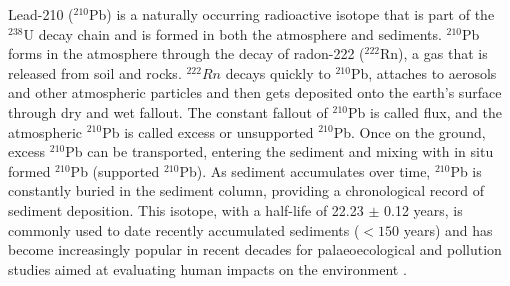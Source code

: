\documentclass [10pt] {article}
\begin{document}
	Lead-210 ($^{210}$Pb) is a naturally occurring radioactive isotope that is part of the $^{238}$U decay chain and is formed in both the atmosphere and sediments. $^{210}$Pb forms in the atmosphere through the decay of radon-222 ($^{222}$Rn), a gas that is released from soil and rocks. $^{222}Rn$ decays quickly to $^{210}$Pb, attaches to aerosols and other atmospheric particles and then gets deposited onto the earth's surface through dry and wet fallout. The constant fallout of $^{210}$Pb is called flux, and the atmospheric $^{210}$Pb is called excess or unsupported $^{210}$Pb. Once on the ground, excess $^{210}$Pb can be transported, entering the sediment and mixing with in situ formed $^{210}$Pb (supported $^{210}$Pb). As sediment accumulates over time, $^{210}$Pb is constantly buried in the sediment column, providing a chronological record of sediment deposition. This isotope, with a half-life of 22.23 $\pm$ 0.12 years, is commonly used to date recently accumulated sediments ($<150$ years) and has become increasingly popular in recent decades for palaeoecological and pollution studies aimed at evaluating human impacts on the environment \citep[e.g.,][]{Courtney2019}.




\end{document}
